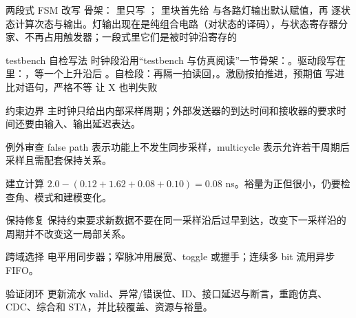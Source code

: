 \begin{chapteranswer}{两段式 FSM 改写}
骨架： 里只写 ； 里块首先给  与各路灯输出默认赋值，再  逐状态计算次态与输出。灯输出现在是纯组合电路（对状态的译码），与状态寄存器分家、不再占用触发器；一段式里它们是被时钟沿寄存的
\end{chapteranswer}

\begin{chapteranswer}{testbench 自检写法}
时钟段沿用“testbench 与仿真阅读”一节骨架：。驱动段写在  里：，等一个上升沿后 。自检段：再隔一拍读回，。激励按拍推进，预期值  写进比对语句，严格不等 \code{!==} 让 X 也判失败
\end{chapteranswer}

\begin{chapteranswer}{约束边界}
主时钟只给出内部采样周期；外部发送器的到达时间和接收器的要求时间还要由输入、输出延迟表达。
\end{chapteranswer}

\begin{chapteranswer}{例外审查}
false path 表示功能上不发生同步采样，multicycle 表示允许若干周期后采样且需配套保持关系。
\end{chapteranswer}

\begin{chapteranswer}{建立计算}
$2.0-(0.12+1.62+0.08+0.10)=0.08$ ns。裕量为正但很小，仍要检查角、模式和建模变化。
\end{chapteranswer}

\begin{chapteranswer}{保持修复}
保持约束要求新数据不要在同一采样沿后过早到达，改变下一采样沿的周期并不改变这一局部关系。
\end{chapteranswer}

\begin{chapteranswer}{跨域选择}
电平用同步器；窄脉冲用展宽、toggle 或握手；连续多 bit 流用异步 FIFO。
\end{chapteranswer}

\begin{chapteranswer}{验证闭环}
更新流水 valid、异常/错误位、ID、接口延迟与断言，重跑仿真、CDC、综合和 STA，并比较覆盖、资源与裕量。
\end{chapteranswer}
